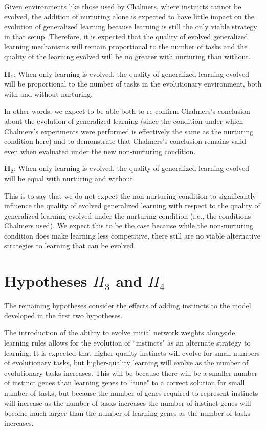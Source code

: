 \documentclass[master]{outhesis}
\begin{document}
Given environments like those used by Chalmers, where instincts cannot be evolved, the addition of nurturing alone is expected to have little impact on the evolution of generalized learning because learning is still the only viable strategy in that setup. Therefore, it is expected that the quality of evolved generalized learning mechanisms will remain proportional to the number of tasks and the quality of the learning evolved will be no greater with nurturing than without.

$\mathbf{H_1}$: When only learning is evolved, the quality of generalized learning evolved will be proportional to the number of tasks in the evolutionary environment, both with and without nurturing.

In other words, we expect to be able both 
to re-confirm Chalmers's conclusion about the evolution of generalized learning
(since the condition under which Chalmers's experiments were performed is effectively the same as the nurturing condition here) 
and to demonstrate that Chalmers's conclusion remains valid even when evaluated under the new non-nurturing condition.

$\mathbf{H_2}$: When only learning is evolved, the quality of generalized learning evolved will be equal with nurturing and without.

This is to say that we do not expect the non-nurturing condition to significantly influence the quality of evolved generalized learning
with respect to the quality of generalized learning evolved under the nurturing condition (i.e., the conditions Chalmers used).
We expect this to be the case because while the non-nurturing condition does make learning less competitive,
there still are no viable alternative strategies to learning that can be evolved.

\section{Hypotheses $H_3$ and $H_4$}

The remaining hypotheses consider the effects of adding instincts to the model developed in the first two hypotheses.

The introduction of the ability to evolve initial network weights alongside learning rules allows for the evolution of ``instincts" as an alternate strategy to learning.
It is expected that higher-quality instincts will evolve for small numbers of evolutionary tasks, but higher-quality learning will evolve as the number of evolutionary tasks increases.
This will be because there will be a smaller number of instinct genes than learning genes to ``tune" to a correct solution for small number of tasks, but because the number of genes required to represent instincts will increase as the number of tasks increases the number of instinct genes will become much larger than the number of learning genes as the number of tasks increases.
\end{document}
